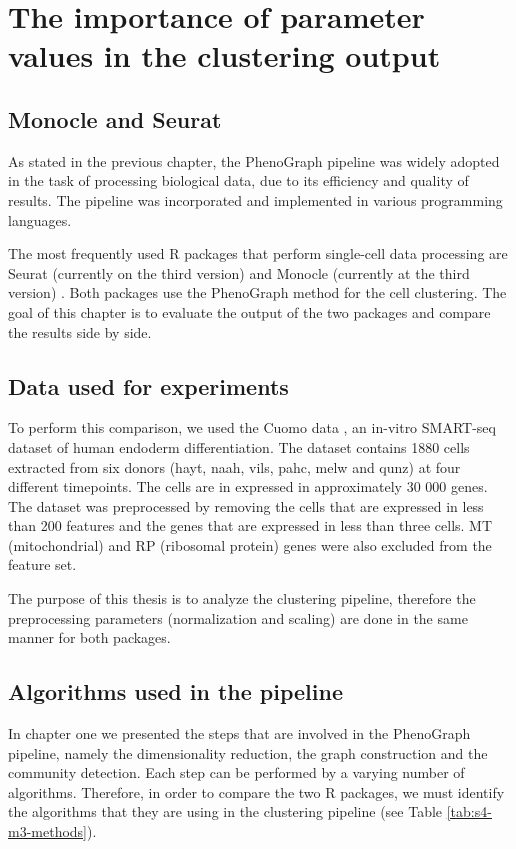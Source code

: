 \chapter{The importance of parameter values in the clustering output}

\section{Monocle and Seurat}
As stated in the previous chapter, the PhenoGraph pipeline was widely adopted in the task of processing biological data, due to its efficiency and quality of results. The pipeline was incorporated and implemented in various programming languages.

The most frequently used R packages that perform single-cell data processing are Seurat (currently on the third version) \cite{Hao2021} and Monocle (currently at the third version) \cite{Cao2019}. Both packages use the PhenoGraph method for the cell clustering. The goal of this chapter is to evaluate the output of the two packages and compare the results side by side.

\section{Data used for experiments}
To perform this comparison, we used the Cuomo data \cite{Cuomo2020}, an in-vitro SMART-seq dataset of human endoderm differentiation. The dataset contains 1880 cells extracted from six donors (hayt, naah, vils, pahc, melw and qunz) at four different timepoints. The cells are in expressed in approximately 30 000 genes. The dataset was preprocessed by removing the cells that are expressed in less than 200 features and the genes that are expressed in less than three cells. MT (mitochondrial) and RP (ribosomal protein) genes were also excluded from the feature set.

The purpose of this thesis is to analyze the clustering pipeline, therefore the preprocessing parameters (normalization and scaling) are done in the same manner for both packages.

\section{Algorithms used in the pipeline}
In chapter one we presented the steps that are involved in the PhenoGraph pipeline, namely the dimensionality reduction, the graph construction and the community detection. Each step can be performed by a varying number of algorithms. Therefore, in order to compare the two R packages, we must identify the algorithms that they are using in the clustering pipeline (see Table \ref{tab:s4-m3-methods}).

